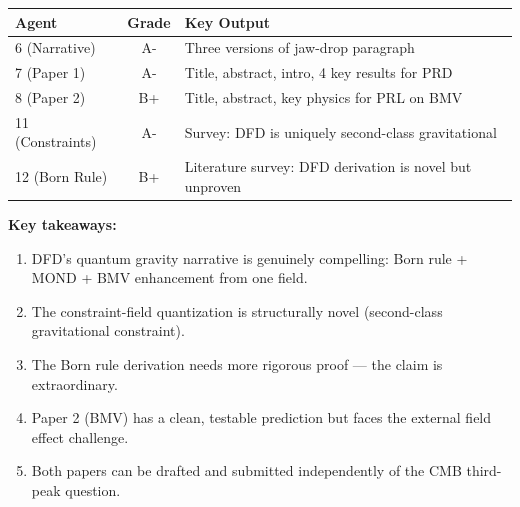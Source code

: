 \documentclass[11pt,a4paper]{article}
\begin{document}
\begin{center}
\begin{tabular}{lcl}
\toprule
\textbf{Agent} & \textbf{Grade} & \textbf{Key Output} \\
\midrule
6 (Narrative) & A- & Three versions of jaw-drop paragraph \\
7 (Paper 1) & A- & Title, abstract, intro, 4 key results for PRD \\
8 (Paper 2) & B+ & Title, abstract, key physics for PRL on BMV \\
11 (Constraints) & A- & Survey: DFD is uniquely second-class gravitational \\
12 (Born Rule) & B+ & Literature survey: DFD derivation is novel but unproven \\
\bottomrule
\end{tabular}
\end{center}

\textbf{Key takeaways:}
\begin{enumerate}
\item DFD's quantum gravity narrative is genuinely compelling: Born rule + MOND + BMV enhancement from one field.
\item The constraint-field quantization is structurally novel (second-class gravitational constraint).
\item The Born rule derivation needs more rigorous proof --- the claim is extraordinary.
\item Paper 2 (BMV) has a clean, testable prediction but faces the external field effect challenge.
\item Both papers can be drafted and submitted independently of the CMB third-peak question.
\end{enumerate}
\end{document}
